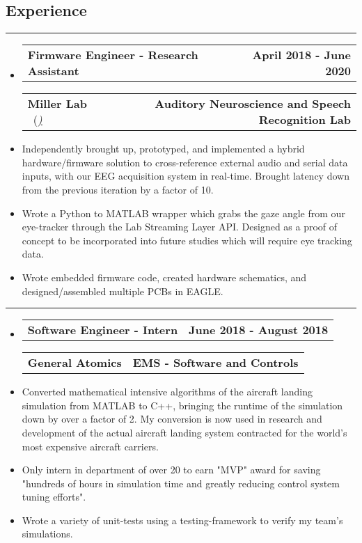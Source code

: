 \documentclass[10pt,letterpaper]{article}
\makeatletter
\newcommand{\items}[2]
{
	\begin{tabular*}{\linewidth}{l @{\extracolsep{\fill}} r}
		#1 & #2 \\
	\end{tabular*}
}
\newcommand{\sectionbreak}
{
	\vspace{-1.2em}
	\rule{\textwidth}{1.7pt}
	\vspace{-1.7em}
}
\makeatother
\begin{document}
\vspace{-1.5em}

\subsection*{Experience}
\sectionbreak



\begin{itemize}
	\item[]
		\items
			{\textbf{Firmware Engineer - Research Assistant}} 
			{\textbf{April 2018 - June 2020}}
		\items
		{\textbf{Miller Lab} \ (\href{https://millerlab.faculty.ucdavis.edu}{\small \emph{\underline{\smash{millerlab.faculty.ucdavis.edu})}}} }
			{\textbf{Auditory Neuroscience and Speech Recognition Lab}} 
		\item
			Independently brought up, prototyped, and implemented a hybrid hardware/firmware solution to cross-reference external audio and serial data inputs, with our EEG acquisition system in real-time. Brought latency down from the previous iteration by a factor of 10. 
		\item 
			Wrote a Python to MATLAB wrapper which grabs the gaze angle from our eye-tracker through the Lab Streaming Layer API. Designed as a proof of concept to be incorporated into future studies which will require eye tracking data.
		\item
			Wrote embedded firmware code, created hardware schematics, and designed/assembled multiple PCBs in EAGLE.
\end{itemize}

\hrule

\begin{itemize}
	\item[]
		\items
			{\textbf{Software Engineer - Intern}} 
			{\textbf{June 2018 - August 2018}}
		\items
			{\textbf{General Atomics}}
			{\textbf{EMS - Software and Controls}} 
		\item
			Converted mathematical intensive algorithms of the aircraft landing simulation from MATLAB to C++, bringing the runtime of the simulation down by over a factor of 2. My conversion is now used in research and development of the actual aircraft landing system contracted for the world’s most expensive aircraft carriers.
		\item
			Only intern in department of over 20 to earn "MVP" award for saving "hundreds of hours in simulation time and greatly reducing control system tuning efforts".
		\item
			Wrote a variety of unit-tests using a testing-framework to verify my team's simulations.

\end{itemize}
\end{document}
